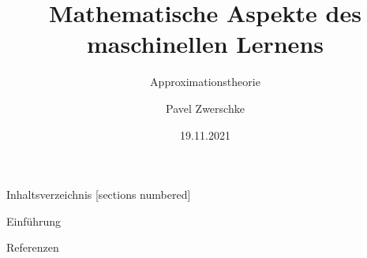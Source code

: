 \documentclass[10pt,aspectratio=169]{beamer}
\title{Mathematische Aspekte des maschinellen Lernens}
\subtitle{Approximationstheorie}
\date{19.11.2021}
\author{Pavel Zwerschke}
\institute{Karlsruher Institut für Technologie}
\begin{document}
\maketitle

\begin{frame}{Inhaltsverzeichnis}
    [sections numbered]
    \tableofcontents%
\end{frame}

\begin{frame}{Einführung}
    
\end{frame}

\begin{frame}{Referenzen}
    \footnotesize
    \printbibliography[heading=none]
\end{frame}
\end{document}

